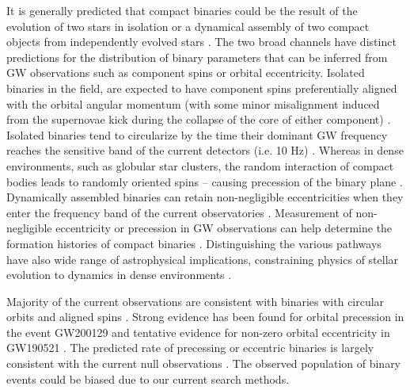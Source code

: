 It is generally predicted that compact binaries could be the result of the evolution of two stars in isolation \cite{Belczynski:2001uc,vandenHeuvel:2017pwp,Marchant:2016wow} or a dynamical assembly of two compact objects from independently evolved stars \cite{Rodriguez:2017pec,Sedda:2020wzl,  Wang:2020jsx, Santoliquido:2020bry}. The two broad channels have distinct predictions for the distribution of binary parameters that can be inferred from GW observations such as component spins or orbital eccentricity. Isolated binaries in the field, are expected to have component spins preferentially aligned with the orbital angular momentum (with some minor misalignment induced from the supernovae kick during the collapse of the core of either component) \cite{Kalogera:1999tq,Gerosa:2018wbw}. Isolated binaries tend to circularize by the time their dominant GW frequency reaches the sensitive band of the current detectors (i.e. 10 Hz) \cite{Peters:1964zz,Belczynski:2001uc}. Whereas in dense environments, such as globular star clusters, the random interaction of compact bodies leads to randomly oriented spins \cite{Rodriguez:2016vmx} -- causing precession of the binary plane \cite{Apostolatos:1994mx}. Dynamically assembled binaries can retain non-negligible eccentricities when they enter the frequency band of the current observatories \cite{Rodriguez:2016vmx,Trani:2021tan,Fragione:2018yrb}. Measurement of non-negligible eccentricity or precession in GW observations can help determine the formation histories of compact binaries \cite{Gompertz:2021xub,Stevenson:2017dlk, Zevin:2021rtf}. Distinguishing the various pathways have also wide range of astrophysical implications, constraining physics of stellar evolution \cite{Belczynski:2001uc,Santoliquido:2020bry,Silsbee:2016djf, Richards:2022fnq, Baibhav:2019gxm} to dynamics in dense environments \cite{Fragione:2018yrb,Ford:2021kcw,Petrovich:2017otm}.


Majority of the current observations are consistent with binaries with circular orbits and aligned spins \cite{KAGRA:2021duu}. Strong evidence has been found for orbital precession in the event GW200129 \cite{Hannam:2021pit} and tentative evidence for non-zero orbital eccentricity in GW190521 \cite{Gayathri:2020coq}. The predicted rate of precessing or eccentric binaries is largely consistent with the current null observations \cite{KAGRA:2021duu}. The observed population of binary events could be biased due to our current search methods. 

